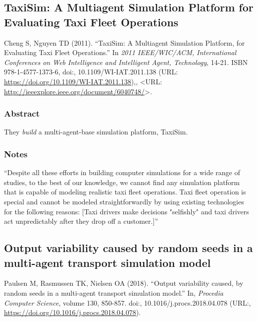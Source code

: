 \documentclass[
]{article}
\begin{document}
\hypertarget{taxisim-a-multiagent-simulation-platform-for-evaluating-taxi-fleet-operations}{%
\subsection{TaxiSim: A Multiagent Simulation Platform for Evaluating
Taxi Fleet
Operations}\label{taxisim-a-multiagent-simulation-platform-for-evaluating-taxi-fleet-operations}}

Cheng S, Nguyen TD (2011). ``TaxiSim: A Multiagent Simulation Platform,
for Evaluating Taxi Fleet Operations.'' In \emph{2011 IEEE/WIC/ACM,
International Conferences on Web Intelligence and Intelligent Agent,
Technology}, 14-21. ISBN 978-1-4577-1373-6, doi:,
10.1109/WI-IAT.2011.138 (URL:
\url{https://doi.org/10.1109/WI-IAT.2011.138}),, \textless URL:
\url{http://ieeexplore.ieee.org/document/6040748/}\textgreater.

\hypertarget{abstract-4}{%
\subsubsection{Abstract}\label{abstract-4}}

They \emph{build} a multi-agent-base simulation platform, TaxiSim.

\hypertarget{notes-4}{%
\subsubsection{Notes}\label{notes-4}}

``Despite all these efforts in building computer simulations for a wide
range of studies, to the best of our knowledge, we cannot find any
simulation platform that is capable of modeling realistic taxi fleet
operations. Taxi fleet operation is special and cannot be modeled
straightforwardly by using existing technologies for the following
reasons: {[}Taxi drivers make decisions "selfishly" and taxi drivers act
unpredictably after they drop off a customer.{]}''

\hypertarget{output-variability-caused-by-random-seeds-in-a-multi-agent-transport-simulation-model}{%
\subsection{Output variability caused by random seeds in a multi-agent
transport simulation
model}\label{output-variability-caused-by-random-seeds-in-a-multi-agent-transport-simulation-model}}

Paulsen M, Rasmussen TK, Nielsen OA (2018). ``Output variability caused,
by random seeds in a multi-agent transport simulation model.'' In,
\emph{Procedia Computer Science}, volume 130, 850-857. doi:,
10.1016/j.procs.2018.04.078 (URL:,
\url{https://doi.org/10.1016/j.procs.2018.04.078}).
\end{document}
